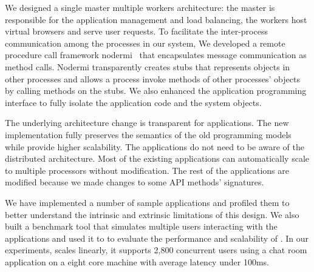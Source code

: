 We designed a single master multiple workers architecture:
the master is responsible for the application management and load balancing,
the workers host virtual browsers and serve user requests.
To facilitate the inter-process
communication among the processes in our system, We developed a remote procedure call
framework nodermi~\cite{nodermi} that encapsulates message communication as
method calls.
Nodermi transparently creates stubs that represents objects in other processes
and allows a process invoke methods of other processes' objects by calling
methods on the stubs.
We also enhanced the application programming interface to fully
isolate the application code and the system objects.

The underlying architecture change is transparent for applications. The new
implementation fully preserves the semantics of the old programming models
while provide higher scalability. The applications do not need to be aware of
the distributed architecture.  Most of the existing applications can
automatically scale to  multiple processors without modification. The rest of
the applications are modified   because we made changes to some API methods'
signatures.

We have implemented a number of sample applications and profiled them to
better understand the intrinsic and extrinsic limitations of this design.  We
also built a benchmark tool that simulates multiple users interacting with the
applications and used it to  to evaluate the performance and scalability of
\cbtwo. In our experiments,  \cbtwo scales linearly, it supports 2,800
concurrent users using a chat room application on a eight core machine with
average latency under 100ms.



